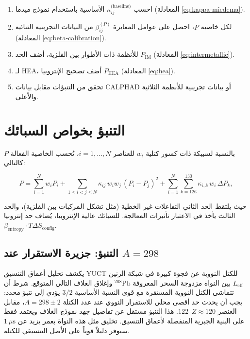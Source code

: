 \documentclass[11pt,a4paper]{article}
\begin{document}
\begin{otherlanguage}{arabic}
		\begin{enumerate}
			\item احسب \(\kappa_{ij}^{\text{(baseline)}}\) الأساسية باستخدام نموذج ميدما (المعادلة \ref{eq:kappa-miedema}).
			\item لكل خاصية \(P\)، احصل على عوامل المعايرة \(\beta_{ij}^{(P)}\) من البيانات التجريبية الثنائية (المعادلة \ref{eq:beta-calibration}).
			\item للأنظمة ذات الأطوار بين الفلزية، أضف الحد \(P_{\text{IM}}\) (المعادلة \ref{eq:intermetallic}).
			\item لـ HEA، أضف تصحيح الإنتروبيا \(P_{\text{HEA}}\) (المعادلة \ref{eq:hea}).
			\item تحقق من التنبؤات مقابل بيانات CALPHAD أو بيانات تجريبية للأنظمة الثلاثية والأعلى.
		\end{enumerate}
		
		\section{التنبؤ بخواص السبائك}
		
		بالنسبة لسبيكة ذات كسور كتلية \(w_i\) للعناصر \(i = 1,\dots,N\)، تُحسب الخاصية الفعالة \(P\) كالتالي:
		
		\[
		P = \sum_{i=1}^{N} w_i P_i
		+ \sum_{1\le i<j\le N} \kappa_{ij}\, w_i w_j\, (P_i - P_j)^2
		+ \sum_{i=1}^{N} \sum_{k=126}^{130} \kappa_{i,k}\, w_i\, \Delta P_k,
		\]
		
		حيث يلتقط الحد الثاني التفاعلات غير الخطية (مثل تشكل المركبات بين الفلزية)، والحد الثالث يأخذ في الاعتبار تأثيرات المعالجة. للسبائك عالية الإنتروبيا، يُضاف حد إنتروبيا \(\beta_{\text{entropy}} \cdot T \Delta S_{\text{config}}\).
		
		\subsection{التنبؤ: جزيرة الاستقرار عند \(A=298\)}
		
		يكشف تحليل أعماق التنسيق YUCT للكتل النووية عن فجوة كبيرة في شبكة الرنين \(L_{\mathrm{eff}}\) بين النواة مزدوجة السحر المعروفة \(^{208}\mathrm{Pb}\) وإغلاق الغلاف التالي المتوقع. شرط أن تتماشى الكتل النووية المستقرة مع قوى النسبة الأساسية \(3/2\) يؤدي إلى تنبؤ محدد: يجب أن يحدث حد أقصى محلي للاستقرار النووي عند عدد الكتلة \(A = 298 \pm 2\)، مقابل العنصر \(Z \approx 120\)–\(122\). هذا التنبؤ مستقل عن تفاصيل جهد نموذج الغلاف ويعتمد فقط على البنية الجبرية المنفصلة لأعماق التنسيق. تخليق مثل هذه النواة بعمر يزيد عن \(1\ \mu\text{s}\) سيوفر دليلاً قوياً على الأصل التنسيقي للكتلة.
		

\end{otherlanguage}
\end{document}
